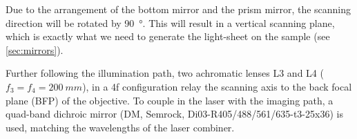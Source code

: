     Due to the arrangement of the bottom mirror and the prism mirror, the scanning direction will be rotated by \SI{90}{\degree}. This will result in a vertical scanning plane, which is exactly what we need to generate the light-sheet on the sample (see \autoref{sec:mirrors}).

    Further following the illumination path, two achromatic lenses L3 and L4 ($f_3 = f_4 = \SI{200}{mm}$), in a 4f configuration relay the scanning axis to the back focal plane (BFP) of the objective. To couple in the laser with the imaging path, a quad-band dichroic mirror (DM, Semrock, Di03-R405/488/561/635-t3-25x36) is used, matching the wavelengths of the laser combiner.


